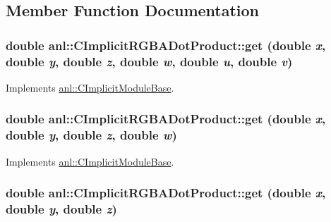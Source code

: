 \subsection{Member Function Documentation}
\hypertarget{classanl_1_1CImplicitRGBADotProduct_a8ffc86bb80adb25aa80ae93e6269d394}{
\subsubsection[{get}]{\setlength{\rightskip}{0pt plus 5cm}double anl::CImplicitRGBADotProduct::get (double {\em x}, \/  double {\em y}, \/  double {\em z}, \/  double {\em w}, \/  double {\em u}, \/  double {\em v})}}
\label{classanl_1_1CImplicitRGBADotProduct_a8ffc86bb80adb25aa80ae93e6269d394}


Implements \hyperlink{classanl_1_1CImplicitModuleBase_aa40b7d54572197612a4fea44b63447eb}{anl::CImplicitModuleBase}.\hypertarget{classanl_1_1CImplicitRGBADotProduct_ac38f2572f66e335ce9bb1e59b2fc7199}{
\subsubsection[{get}]{\setlength{\rightskip}{0pt plus 5cm}double anl::CImplicitRGBADotProduct::get (double {\em x}, \/  double {\em y}, \/  double {\em z}, \/  double {\em w})}}
\label{classanl_1_1CImplicitRGBADotProduct_ac38f2572f66e335ce9bb1e59b2fc7199}


Implements \hyperlink{classanl_1_1CImplicitModuleBase_a3cf520bdab59631864253c03b4e1723f}{anl::CImplicitModuleBase}.\hypertarget{classanl_1_1CImplicitRGBADotProduct_aaf1fa4fa39be36a09dde553b73a14537}{
\subsubsection[{get}]{\setlength{\rightskip}{0pt plus 5cm}double anl::CImplicitRGBADotProduct::get (double {\em x}, \/  double {\em y}, \/  double {\em z})}}
\label{classanl_1_1CImplicitRGBADotProduct_aaf1fa4fa39be36a09dde553b73a14537}


